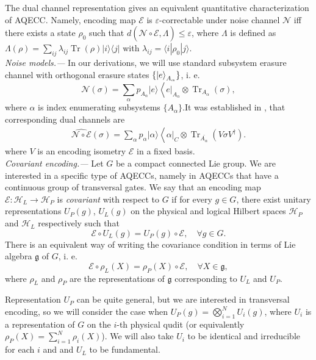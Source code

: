 \documentclass[twocolumn,superscriptaddress,aps,showpacs,amsmath,amstex,amssymb,citeautoscript,floatfix,pra,preprintnumbers]{revtex4-2}
\newcounter{alg}
\theoremstyle{plain}
\theoremstyle{plain}
\theoremstyle{plain}
\theoremstyle{plain}
\theoremstyle{plain}
\theoremstyle{plain}
\begin{document}
The dual channel representation gives an equivalent quantitative characterization of AQECC. Namely, encoding map $\mathcal{E}$ is $\varepsilon$-correctable under noise channel $\mathcal{N}$ iff there exists a state $\rho_0$ such that $d(\widehat{\mathcal{N} \circ \mathcal{E}}, \Lambda) \leq \varepsilon$, where $\Lambda$ is defined as $\Lambda(\rho)=\sum_{i j} \lambda_{i j} \operatorname{Tr}(\rho)|i\rangle\langle j|$ with $\lambda_{i j}=\langle i| \rho_0|j\rangle$.\\
\textit{Noise models.---} 
In our derivations, we will use standard subsystem erasure channel with orthogonal erasure states $\{\ket{e}_{A_{\alpha}}\}$, i. e.
\[
    \mathcal{N}(\sigma)=\sum_{\alpha} p_{A_{\alpha}}|{e}\rangle\left\langle\left. {e}\right|_{A_{\alpha}}\right.\otimes \operatorname{Tr}_{A_{\alpha}}(\sigma),
\]
where $\alpha$ is index enumerating subsystems $\{A_{\alpha}\}$.It was established in \cite{Faist2020}, that corresponding dual channels are
\[
\begin{gathered}
    \widehat{\mathcal{N}\circ \mathcal{E}}\left(\sigma\right)=\sum_{\alpha} p_{\alpha}|\alpha\rangle\left\langle\left. \alpha\right|_C \otimes \operatorname{Tr}_{\bar{A_{\alpha}}}\left(V\sigma V^{\dagger}\right) .\right.
\end{gathered}
\]
where $V$ is an encoding isometry $\mathcal{E}$ in a fixed basis.\\
\textit{Covariant encoding.---}
Let $G$ be a compact connected Lie group. We are interested in a specific type of AQECCs, namely in AQECCs that have a continuous group of transversal gates. We say that an encoding map $\mathcal{E}: \mathcal{H}_L \to \mathcal{H}_P$ is \textit{covariant} with respect to $G$ if for every $g \in G$, there exist unitary representations $U_P(g)$, $U_L(g)$ on the physical and logical Hilbert spaces $\mathcal{H}_P$ and $\mathcal{H}_L$ respectively such that
\[
    \mathcal{E} \circ U_L(g) = U_P(g) \circ \mathcal{E}, \quad \forall g\in G.
\]
There is an equivalent way of writing the covariance condition in terms of Lie algebra $\mathfrak{g}$ of $G$, i. e.
\[
    \mathcal{E} \circ \rho_L(X) = \rho_P(X) \circ \mathcal{E}, \quad \forall X\in \mathfrak{g}, 
\]
where $\rho_L$ and $\rho_P$ are the representations of $\mathfrak{g}$ corresponding to $U_L$ and $U_P$.

Representation $U_P$ can be quite general, but we are interested in transversal encoding, so we will consider the case when $U_P(g) = \bigotimes_{i=1}^N U_i(g)$, where $U_i$ is a representation of $G$ on the $i$-th physical qudit (or 
equivalently $\rho_P(X) = \sum_{i=1}^N \rho_i(X)$). We will also take $U_i$ to be identical and irreducible for each $i$ and and $U_L$ to be fundamental.
\end{document}
